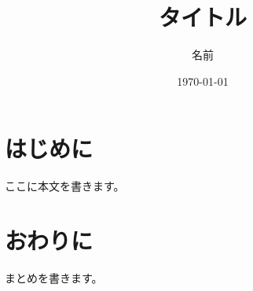 \documentclass[uplatex,dvipdfmx,a4paper,11pt]{jsarticle}
\title{タイトル}
\author{名前}
\date{\today}
\begin{document}
\maketitle

\section{はじめに}
ここに本文を書きます。

\section{おわりに}
まとめを書きます。
\end{document}
